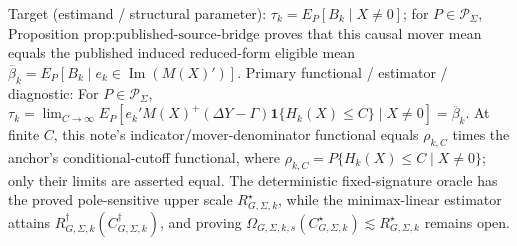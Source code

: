 \documentclass{article}
\begin{document}
Target (estimand / structural parameter): \(\tau_k=E_P[B_k\mid X\ne0]\); for \(P\in\mathcal P_\Sigma\), Proposition \(\text{prop:published-source-bridge}\) proves that this causal mover mean equals the published induced reduced-form eligible mean \(\overline\beta_k=E_P[B_k\mid e_k\in\operatorname{Im}(M(X)')]\).
Primary functional / estimator / diagnostic: For \(P\in\mathcal P_\Sigma\), \(\tau_k=\lim_{C\to\infty}E_P[e_k'M(X)^+(\Delta Y-\Gamma)\mathbf 1\{H_k(X)\le C\}\mid X\ne0]=\overline\beta_k\). At finite \(C\), this note's indicator/mover-denominator functional equals \(\rho_{k,C}\) times the anchor's conditional-cutoff functional, where \(\rho_{k,C}=P\{H_k(X)\le C\mid X\ne0\}\); only their limits are asserted equal. The deterministic fixed-signature oracle has the proved pole-sensitive upper scale \(R_{G,\Sigma,k}^{\star}\), while the minimax-linear estimator attains \(R_{G,\Sigma,k}^{\dagger}(C_{G,\Sigma,k}^{\dagger})\), and proving \(\Omega_{G,\Sigma,k,s}(C_{G,\Sigma,k}^{\star})\lesssim R_{G,\Sigma,k}^{\star}\) remains open.
\end{document}
